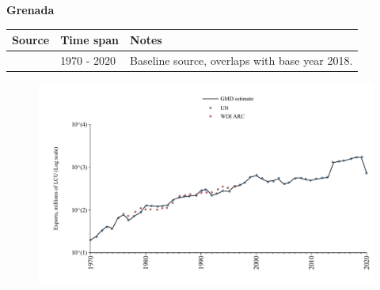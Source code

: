 \documentclass[12pt,a4paper,landscape]{article}
\begin{document}
\begin{adjustbox}{max totalsize={\paperwidth}{\paperheight},center}
\begin{minipage}[t][\textheight][t]{\textwidth}
\vspace*{0.5cm}
{}
\begin{center}
{\Large\bfseries Grenada}
\end{center}
\vspace{0.5cm}
\begin{table}[H]
\centering
\small
\begin{tabular}{|l|l|l|}
\hline
\textbf{Source} & \textbf{Time span} & \textbf{Notes} \\
\hline
\rowcolor{white}\cite{UN}& 1970 - 2020 &Baseline source, overlaps with base year 2018.\\
\hline
\end{tabular}
\end{table}
\begin{figure}[H]
\centering
\includegraphics[width=\textwidth,height=0.6\textheight,keepaspectratio]{graphs/GRD_exports.pdf}
\end{figure}
\end{minipage}
\end{adjustbox}
\end{document}
